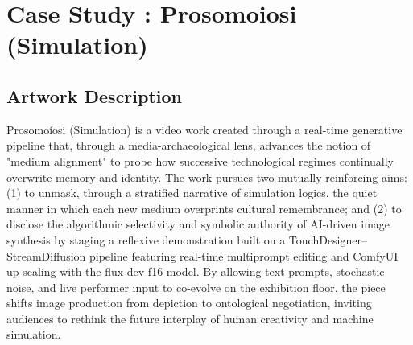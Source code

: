 \documentclass[sigconf,nonacm]{acmart}
\begin{document}
\section{Case Study : Prosomoiosi (Simulation)}

\subsection{Artwork Description}

Prosomoíosi (Simulation) is a video work created through a real-time generative pipeline that, through a media-archaeological lens, advances the notion of "medium alignment" to probe how successive technological regimes continually overwrite memory and identity. The work pursues two mutually reinforcing aims: (1) to unmask, through a stratified narrative of simulation logics, the quiet manner in which each new medium overprints cultural remembrance; and (2) to disclose the algorithmic selectivity and symbolic authority of AI-driven image synthesis by staging a reflexive demonstration built on a TouchDesigner–StreamDiffusion pipeline featuring real-time multiprompt editing and ComfyUI up-scaling with the flux-dev f16 model. By allowing text prompts, stochastic noise, and live performer input to co-evolve on the exhibition floor, the piece shifts image production from depiction to ontological negotiation, inviting audiences to rethink the future interplay of human creativity and machine simulation.
\end{document}
